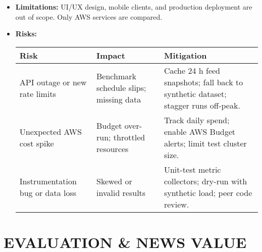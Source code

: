 \documentclass[11pt]{article}
\begin{document}
\begin{itemize}[leftmargin=*, label={}]
    \item \textbf{Limitations:} UI/UX design, mobile clients, and production deployment are out of scope. Only AWS services are compared.
  
  \newpage

  \item \textbf{Risks:}

\begin{center}
\small
\begin{tabular}{@{}p{3.5cm}p{4cm}p{5cm}@{}}
\toprule
\textbf{Risk} & \textbf{Impact} & \textbf{Mitigation} \\
\midrule
API outage or new rate limits &
Benchmark schedule slips; missing data &
Cache 24 h feed snapshots; fall back to synthetic dataset; stagger runs off-peak. \\

Unexpected AWS cost spike &
Budget over-run; throttled resources &
Track daily spend; enable AWS Budget alerts; limit test cluster size. \\

Instrumentation bug or data loss &
Skewed or invalid results &
Unit-test metric collectors; dry-run with synthetic load; peer code review. \\
\bottomrule
\end{tabular}
\end{center}


\end{itemize}

\section*{EVALUATION \& NEWS VALUE}
\end{document}

